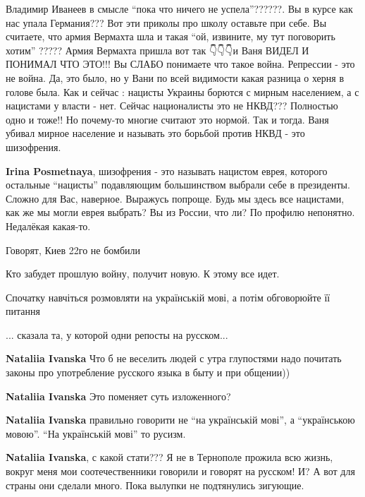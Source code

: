 \begin{itemize}
\begin{itemize}
\begin{itemize}

\obeycr
Владимир Иванеев в смысле \enquote{пока что ничего не успела}??????. Вы в курсе как нас упала Германия??? Вот эти приколы про школу оставьте при себе.
Вы считаете, что армия Вермахта шла и такая \enquote{ой, извините, му тут поговорить хотим} ?????
Армия Вермахта пришла вот так 👇👇👇и Ваня ВИДЕЛ И ПОНИМАЛ ЧТО ЭТО!!!
Вы СЛАБО понимаете что такое война.
Репрессии - это не война. Да, это было, но у Вани по всей видимости какая
разница о херня в голове была. Как и сейчас : нацисты Украины борются с мирным
населением, а с нацистами у власти - нет. Сейчас националисты это не НКВД???
Полностью одно и тоже!! Но почему-то многие считают это нормой. Так и тогда.
Ваня убивал мирное население и называть это борьбой против НКВД - это
шизофрения.
\restorecr

\textbf{Irina Posmetnaya}, шизофрения - это называть нацистом еврея, которого
остальные \enquote{нацисты} подавляющим большинством выбрали себе в президенты. Сложно
для Вас, наверное. Выражусь попроще. Будь мы здесь все нацистами, как же мы
могли еврея выбрать? Вы из России, что ли? По профилю непонятно. Недалёкая
какая-то.

\end{itemize}


Говорят, Киев 22го не бомбили

Кто забудет прошлую войну, получит новую. К этому все идет.

\begin{itemize}
Спочатку навчіться розмовляти на українській мові, а потім обговорюйте її питання

... сказала та, у которой одни репосты на русском...

\textbf{Nataliia Ivanska} Что б не веселить людей с утра глупостями надо почитать законы про употребление русского языка в быту и при общении))

\textbf{Nataliia Ivanska} Это поменяет суть изложенного?

\textbf{Nataliia Ivanska} правильно говорити не \enquote{на українській мові}, а \enquote{українською мовою}. \enquote{На українській мові} то русизм.

\textbf{Nataliia Ivanska}, с какой стати??? Я не в Тернополе прожила всю жизнь,
вокруг меня мои соотечественники говорили и говорят на русском! И? А вот для
страны они сделали много. Пока вылупки не подтянулись зигующие.


\end{itemize}
\end{itemize}
\end{itemize}
